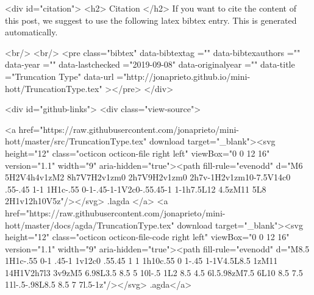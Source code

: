  
  <div id="citation">
  <h2> Citation </h2>
  If you want to cite the content of this post,
  we suggest to use the following latex bibtex entry.
  This is generated automatically.

  <br/>
  <br/>
  <pre class="bibtex"
       data-bibtextag =""
       data-bibtexauthors =""
       data-year =""
       data-lastchecked ="2019-09-08"
       data-originalyear =""
       data-title ="Truncation Type"
       data-url ="http://jonaprieto.github.io/mini-hott/TruncationType.tex"
  ></pre>
  </div>
  

  <div id="github-links">
    <div class="view-source">
      
        <a href="https://raw.githubusercontent.com/jonaprieto/mini-hott/master/src/TruncationType.tex" download target="_blank"><svg height="12" class="octicon octicon-file right left" viewBox="0 0 12 16" version="1.1" width="9" aria-hidden="true"><path fill-rule="evenodd" d="M6 5H2V4h4v1zM2 8h7V7H2v1zm0 2h7V9H2v1zm0 2h7v-1H2v1zm10-7.5V14c0 .55-.45 1-1 1H1c-.55 0-1-.45-1-1V2c0-.55.45-1 1-1h7.5L12 4.5zM11 5L8 2H1v12h10V5z"/></svg> .lagda </a>
        <a href="https://raw.githubusercontent.com/jonaprieto/mini-hott/master/docs/agda/TruncationType.tex" download target="_blank"><svg height="12" class="octicon octicon-file-code right left" viewBox="0 0 12 16" version="1.1" width="9" aria-hidden="true"><path fill-rule="evenodd" d="M8.5 1H1c-.55 0-1 .45-1 1v12c0 .55.45 1 1 1h10c.55 0 1-.45 1-1V4.5L8.5 1zM11 14H1V2h7l3 3v9zM5 6.98L3.5 8.5 5 10l-.5 1L2 8.5 4.5 6l.5.98zM7.5 6L10 8.5 7.5 11l-.5-.98L8.5 8.5 7 7l.5-1z"/></svg> .agda</a>
      
